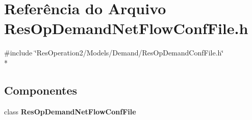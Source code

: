 \section{Referência do Arquivo Res\+Op\+Demand\+Net\+Flow\+Conf\+File.\+h}
\label{_res_op_demand_net_flow_conf_file_8h}
{\ttfamily \#include \char`\"{}Res\+Operation2/\+Models/\+Demand/\+Res\+Op\+Demand\+Conf\+File.\+h\char`\"{}}\\*
\subsection*{Componentes}
\begin{DoxyCompactItemize}
\item 
class {\bf Res\+Op\+Demand\+Net\+Flow\+Conf\+File}
\end{DoxyCompactItemize}

